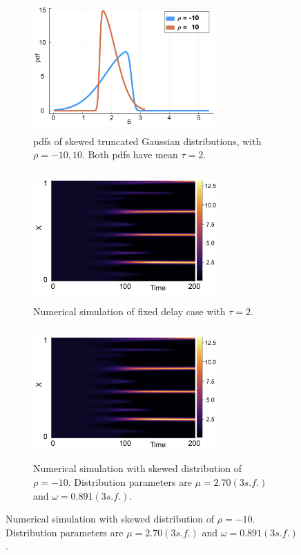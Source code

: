 \begin{figure}[H]
    \centering
    \begin{subfigure}[t]{0.45\textwidth}
        \centering
        \includegraphics[width=7cm,height=5cm]{distskew2.png}
        \caption{pdfs of skewed truncated Gaussian distributions, with $\rho=-10,10$. Both pdfs have mean $\tau=2$.}
        \label{}
    \end{subfigure}
    \hfill
    \begin{subfigure}[t]{0.45\textwidth}
        \centering
        \includegraphics[width=7cm,height=5cm]{fixt2.png}
        \caption{Numerical simulation of fixed delay case with $\tau=2.$}
        \label{}
    \end{subfigure}
    \hfill
    \begin{subfigure}[t]{0.45\textwidth}
        \centering
        \includegraphics[width=7cm,height=5cm]{fixt2.png}
        \caption{Numerical simulation with skewed distribution of $\rho=-10$. Distribution parameters are $\mu=2.70(3 s.f.)$ and $\omega=0.891(3 s.f.)$.}
        \label{}

\end{subfigure}
\end{figure}
